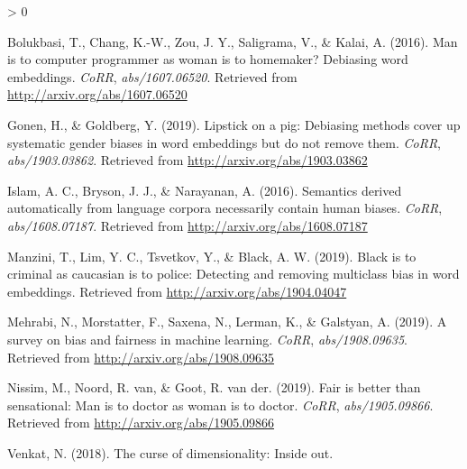 \documentclass[
  12pt,
]{book}
\newlength{\cslhangindent}
\newenvironment{CSLReferences}[2] %
 {%
  \setlength{\parindent}{0pt}
  \ifodd #1 \everypar{\setlength{\hangindent}{\cslhangindent}}\ignorespaces\fi
  \ifnum #2 > 0
  \setlength{\parskip}{#2\baselineskip}
  \fi
 }%
 {}
\begin{document}
\hypertarget{refs}{}
\begin{CSLReferences}{1}{0}
\leavevmode\hypertarget{ref-Bolukbasi2016Man}{}%
Bolukbasi, T., Chang, K.-W., Zou, J. Y., Saligrama, V., \& Kalai, A. (2016). Man is to computer programmer as woman is to homemaker? Debiasing word embeddings. \emph{CoRR}, \emph{abs/1607.06520}. Retrieved from \url{http://arxiv.org/abs/1607.06520}

\leavevmode\hypertarget{ref-Gonen2019Lipstick}{}%
Gonen, H., \& Goldberg, Y. (2019). Lipstick on a pig: Debiasing methods cover up systematic gender biases in word embeddings but do not remove them. \emph{CoRR}, \emph{abs/1903.03862}. Retrieved from \url{http://arxiv.org/abs/1903.03862}

\leavevmode\hypertarget{ref-Caliskan2017Semantics}{}%
Islam, A. C., Bryson, J. J., \& Narayanan, A. (2016). Semantics derived automatically from language corpora necessarily contain human biases. \emph{CoRR}, \emph{abs/1608.07187}. Retrieved from \url{http://arxiv.org/abs/1608.07187}

\leavevmode\hypertarget{ref-Manzini2019blackToCriminal}{}%
Manzini, T., Lim, Y. C., Tsvetkov, Y., \& Black, A. W. (2019). Black is to criminal as caucasian is to police: Detecting and removing multiclass bias in word embeddings. Retrieved from \url{http://arxiv.org/abs/1904.04047}

\leavevmode\hypertarget{ref-Mehrabi2019Survey}{}%
Mehrabi, N., Morstatter, F., Saxena, N., Lerman, K., \& Galstyan, A. (2019). A survey on bias and fairness in machine learning. \emph{CoRR}, \emph{abs/1908.09635}. Retrieved from \url{http://arxiv.org/abs/1908.09635}

\leavevmode\hypertarget{ref-Nissim2019Fair}{}%
Nissim, M., Noord, R. van, \& Goot, R. van der. (2019). Fair is better than sensational: Man is to doctor as woman is to doctor. \emph{CoRR}, \emph{abs/1905.09866}. Retrieved from \url{http://arxiv.org/abs/1905.09866}

\leavevmode\hypertarget{ref-Venkat2018Curse}{}%
Venkat, N. (2018). The curse of dimensionality: Inside out.

\end{CSLReferences}
\end{document}
